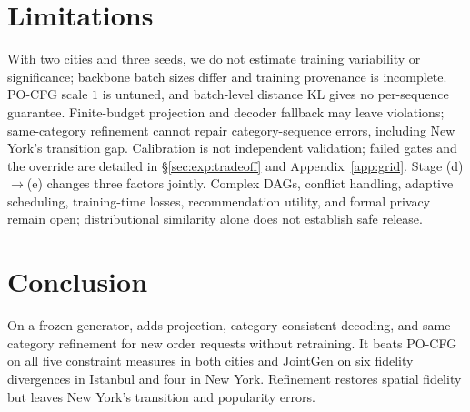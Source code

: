 \section{Limitations}
\label{sec:limitations}
With two cities and three seeds, we do not estimate training variability or
significance; backbone batch sizes differ and training provenance is incomplete.
PO-CFG scale $1$ is untuned, and batch-level distance KL gives no per-sequence
guarantee. Finite-budget projection and decoder fallback may leave violations;
same-category refinement cannot repair category-sequence errors, including
New York's transition gap. Calibration is not independent validation; failed
gates and the override are detailed in \S\ref{sec:exp:tradeoff} and
Appendix~\ref{app:grid}. Stage (d)$\to$(e) changes three factors jointly.
Complex DAGs, conflict handling, adaptive scheduling, training-time losses,
recommendation utility, and formal privacy remain open; distributional
similarity alone does not establish safe release.

\section{Conclusion}
\label{sec:conclusion}
On a frozen generator, \pcdg adds projection, category-consistent decoding, and
same-category refinement for new order requests without retraining. It beats
PO-CFG on all five constraint measures in both cities and JointGen on six
fidelity divergences in Istanbul and four in New York. Refinement restores
spatial fidelity but leaves New York's transition and popularity errors.
\label{end:main}
